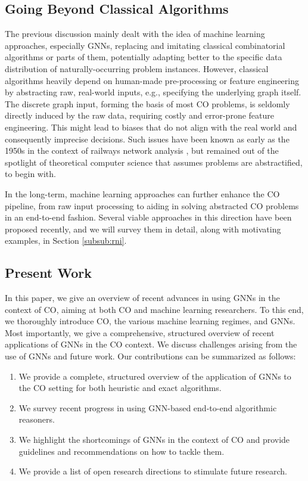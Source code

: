 \documentclass[twoside,11pt]{article}
\begin{document}
\subsection{Going Beyond Classical Algorithms}

The previous discussion mainly dealt with the idea of machine learning approaches, especially GNNs, replacing and imitating classical combinatorial algorithms or parts of them, potentially adapting better to the specific data distribution of naturally-occurring problem instances. However, classical algorithms heavily depend on human-made pre-processing or feature engineering by abstracting raw, real-world inputs, e.g., specifying the underlying graph itself. The discrete graph input, forming the basis of most CO problems, is seldomly directly induced by the raw data, requiring costly and error-prone {feature engineering}. This might lead to biases that do not align with the real world and consequently imprecise decisions. Such issues have been known as early as the 1950s in the context of railways network analysis \citep{harris1955fundamentals}, but remained out of the spotlight of theoretical computer science that assumes problems are abstractified, to begin with.

In the long-term, machine learning approaches can further enhance the CO pipeline, from raw input processing to aiding in solving abstracted CO problems in an end-to-end fashion. Several viable approaches in this direction have been proposed recently, and we will survey them in detail, along with motivating examples, in Section \ref{subsub:rni}.

\subsection{Present Work} In this paper, we give an overview of recent advances in using GNNs in the context of CO, aiming at both CO and machine learning researchers. To this end, we thoroughly introduce CO, the various machine learning regimes, and GNNs. Most importantly, we give a comprehensive, structured overview of recent applications of GNNs in the CO context. 
We discuss challenges arising from the use of GNNs and future work. Our contributions can be summarized as follows:
\begin{enumerate}
	\item We provide a complete, structured overview of the application of GNNs to the CO setting for both heuristic and exact algorithms.
	\item We survey recent progress in using GNN-based end-to-end algorithmic reasoners.
	\item We highlight the shortcomings of GNNs in the context of CO and provide guidelines and recommendations on how to tackle them.
	\item We provide a list of open research directions to stimulate future research.
\end{enumerate}
\end{document}
